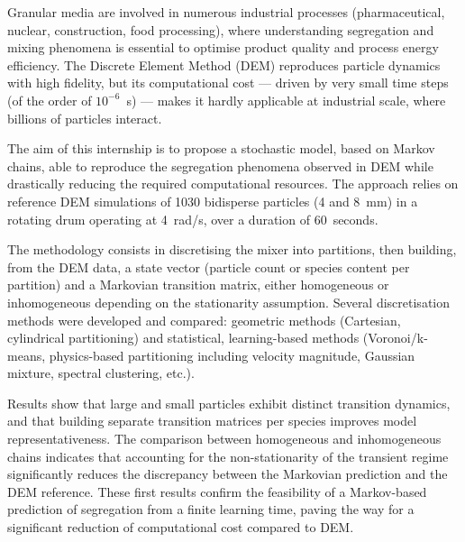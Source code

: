\documentclass{MemoireMaster}
\begin{document}
\begin{resumeen}
Granular media are involved in numerous industrial processes (pharmaceutical, nuclear, construction, food processing), where understanding segregation and mixing phenomena is essential to optimise product quality and process energy efficiency. The Discrete Element Method (DEM) reproduces particle dynamics with high fidelity, but its computational cost --- driven by very small time steps (of the order of $10^{-6}$~s) --- makes it hardly applicable at industrial scale, where billions of particles interact.

The aim of this internship is to propose a stochastic model, based on Markov chains, able to reproduce the segregation phenomena observed in DEM while drastically reducing the required computational resources. The approach relies on reference DEM simulations of 1030 bidisperse particles (4 and 8~mm) in a rotating drum operating at 4~rad/s, over a duration of 60~seconds.

The methodology consists in discretising the mixer into partitions, then building, from the DEM data, a state vector (particle count or species content per partition) and a Markovian transition matrix, either homogeneous or inhomogeneous depending on the stationarity assumption. Several discretisation methods were developed and compared: geometric methods (Cartesian, cylindrical partitioning) and statistical, learning-based methods (Voronoi/k-means, physics-based partitioning including velocity magnitude, Gaussian mixture, spectral clustering, etc.).

Results show that large and small particles exhibit distinct transition dynamics, and that building separate transition matrices per species improves model representativeness. The comparison between homogeneous and inhomogeneous chains indicates that accounting for the non-stationarity of the transient regime significantly reduces the discrepancy between the Markovian prediction and the DEM reference. These first results confirm the feasibility of a Markov-based prediction of segregation from a finite learning time, paving the way for a significant reduction of computational cost compared to DEM.
\end{resumeen}

\tabledematieres
\end{document}

